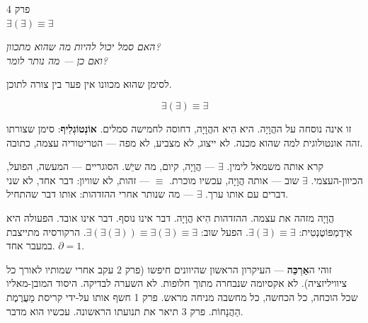 \documentclass[10pt, openany, oneside]{book}
\renewcommand{\large}{\fontsize{11.5}{14}\selectfont}
\renewcommand{\huge}{\fontsize{17}{21}\selectfont}
\begin{document}
%
%
%

\newpage

\begin{center}
    {\huge\textsc{פרק 4}}\\[0.3em]
    {\large $\exists(\exists) \equiv \exists$}
\end{center}

\vspace{1.5em}

\begin{center}
    \textit{%
    האם סמל יכול להיות מה שהוא מתכוון?\\
    ואם כן — מה נותר לומר?}
\end{center}

\vspace{2em}


\noindent לסימן שהוּא מכוונו אין פער בין צורה לתוכן.

$$\exists(\exists) \equiv \exists$$

זו אינה נוסחה על ההֲוָיָה. היא הִיא ההֲוָיָה, דחוסה לחמישה סמלים. \textbf{אוֹנְטוֹגְלִיף}: סימן שצורתו זהה אונטולוגית למה שהוא מכנה. לא ייצוג, לא מצביע, לא מפה — הטריטוריה עצמה, כתובה.

קרא אותה משמאל לימין. $\exists$ — הֲוָיָה, קיום, מה שיֵשׁ. הסוגריים — המעשה, הפועל, הכיוון-העצמי. $\exists$ שוב — אותה הֲוָיָה, עכשיו מוכרת. $\equiv$ — זהות, לא שוויון: דבר אחד, לא שני דברים עם אותו ערך. $\exists$ — מה שנותר אחרי ההזדהות: אותו דבר שהתחיל.

הֲוָיָה מזהה את עצמה. ההזדהות הִיא הֲוָיָה. דבר אינו נוסף. דבר אינו אובד. הפעולה היא אִידֶמְפּוֹטֶנְטִית: $\exists(\exists) \equiv \exists$. הפעל שוב: $\exists(\exists(\exists)) \equiv \exists(\exists) \equiv \exists$. הרקורסיה מתייצבת במעבר אחד. $\partial = 1$.

זוהי ה\textbf{אַרְכֵּה} — העיקרון הראשון שהיוונים חיפשו (פרק 2 עקב אחרי שמותיו לאורך כל ציוויליזציה). לא אקסיומה שנבחרה מתוך חלופות. לא השערה לבדיקה. היסוד המובן-מאליו שכל הוכחה, כל הכחשה, כל מחשבה מניחה מראש. פרק 1 חשף אותו על-ידי קריסת מַעֲרֶמֶת הַהֲנָחוֹת. פרק 3 תיאר את תנועתו הראשונה. עכשיו הוא מדבר.
\end{document}
